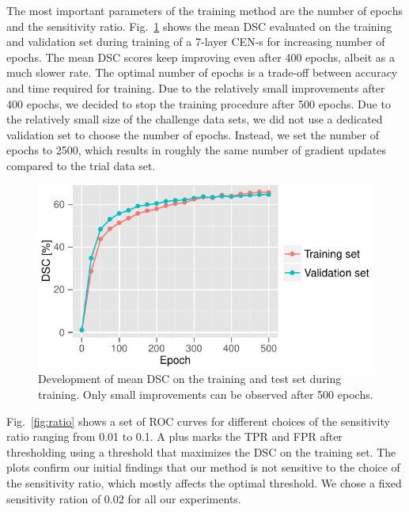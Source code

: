 The most important parameters of the training method are the number of epochs
and the sensitivity ratio. Fig.~\ref{fig:epochs} shows the mean DSC evaluated on
the training and validation set during training of a 7-layer CEN-s for
increasing number of epochs. The mean DSC scores keep improving even after 400
epochs, albeit as a much slower rate. The optimal number of epochs is a
trade-off between accuracy and time required for training. Due to the relatively
small improvements after 400 epochs, we decided to stop the training procedure
after 500 epochs. Due to the relatively small size of the challenge data
sets, we did not use a dedicated validation set to choose the number of epochs.
Instead, we set the number of epochs to 2500, which results in roughly the same
number of gradient updates compared to the trial data set.
\begin{figure}
\centering
\includegraphics[width=\columnwidth]{figures/ems_progress2}
\caption{Development of mean DSC on the training and test set during training.
Only small improvements can be observed after 500 epochs.}
\label{fig:epochs}
\end{figure}

Fig.~\ref{fig:ratio} shows a set of ROC curves for different choices of the
sensitivity ratio ranging from 0.01 to 0.1. A plus marks the TPR and FPR after
thresholding using a threshold that maximizes the DSC on the training set. The
plots confirm our initial findings that our method is not sensitive to the
choice of the sensitivity ratio, which mostly affects the optimal threshold. We
chose a fixed sensitivity ration of 0.02 for all our experiments.


